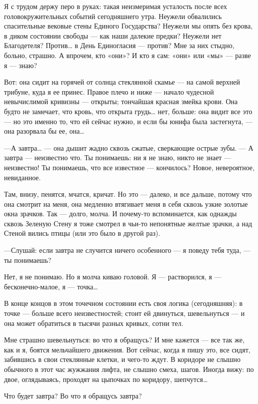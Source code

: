 \documentclass[11pt,openany]{book}
\begin{document}
Я с трудом держу перо в руках: такая неизмеримая усталость после всех головокружительных событий сегодняшнего утра. Неужели обвалились спасительные вековые стены Единого Государства? Неужели мы опять без крова, в диком состоянии свободы --- как наши далекие предки? Неужели нет Благодетеля? Против\ldots{} в День Единогласия --- против? Мне за них стыдно, больно, страшно. А впрочем, кто «они»? И кто я сам: «они» или «мы» --- разве я --- знаю?

Вот: она сидит на горячей от солнца стеклянной скамье --- на самой верхней трибуне, куда я ее принес. Правое плечо и ниже --- начало чудесной невычислимой кривизны --- открыты; тончайшая красная змейка крови. Она будто не замечает, что кровь, что открыта грудь\ldots{} нет, больше: она видит все это --- но это именно то, что ей сейчас нужно, и если бы юнифа была застегнута, --- она разорвала бы ее, она\ldots{}

---А завтра\ldots{} --- она дышит жадно сквозь сжатые, сверкающие острые зубы. --- А завтра --- неизвестно что. Ты понимаешь: ни я не знаю, никто не знает --- неизвестно! Ты понимаешь, что все известное --- кончилось? Новое, невероятное, невиданное.

Там, внизу, пенятся, мчатся, кричат. Но это --- далеко, и все дальше, потому что она смотрит на меня, она медленно втягивает меня в себя сквозь узкие золотые окна зрачков. Так --- долго, молча. И почему-то вспоминается, как однажды сквозь Зеленую Стену я тоже смотрел в чьи-то непонятные желтые зрачки, а над Стеной вились птицы (или это было в другой раз).

---Слушай: если завтра не случится ничего особенного --- я поведу тебя туда, --- ты понимаешь?

Нет, я не понимаю. Но я молча киваю головой. Я --- растворился, я --- бесконечно-малое, я --- точка\ldots{}

В конце концов в этом точечном состоянии есть своя логика (сегодняшняя): в точке --- больше всего неизвестностей; стоит ей двинуться, шевельнуться --- и она может обратиться в тысячи разных кривых, сотни тел.

Мне страшно шевельнуться: во что я обращусь? И мне кажется --- все так же, как и я, боятся мельчайшего движения. Вот сейчас, когда я пишу это, все сидят, забившись в свои стеклянные клетки, и чего-то ждут. В коридоре не слышно обычного в этот час жужжания лифта, не слышно смеха, шагов. Иногда вижу: по двое, оглядываясь, проходят на цыпочках по коридору, шепчутся\ldots{}

Что будет завтра? Во что я обращусь завтра?
\end{document}
